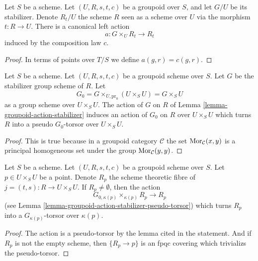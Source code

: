 \begin{lemma}
\label{lemma-groupoid-action-stabilizer}
Let $S$ be a scheme.
Let $(U, R, s, t, c)$ be a groupoid over $S$, and let $G/U$ be its stabilizer.
Denote $R_t/U$ the scheme $R$ seen as a scheme over $U$ via the
morphism $t : R \to U$.
There is a canonical left action
$$
a : G \times_U R_t \longrightarrow R_t
$$
induced by the composition law $c$.
\end{lemma}

\begin{proof}
In terms of points over $T/S$ we define $a(g, r) = c(g, r)$.
\end{proof}

\begin{lemma}
\label{lemma-groupoid-action-stabilizer-pseudo-torsor}
Let $S$ be a scheme. Let $(U, R, s, t, c)$ be a groupoid scheme
over $S$. Let $G$ be the stabilizer group scheme of $R$.
Let
$$
G_0 = G \times_{U, \text{pr}_0} (U \times_S U) = G \times_S U
$$
as a group scheme over $U \times_S U$. The action of $G$ on $R$ of
Lemma \ref{lemma-groupoid-action-stabilizer}
induces an action of $G_0$ on $R$ over $U \times_S U$
which turns $R$ into a pseudo $G_0$-torsor over $U \times_S U$.
\end{lemma}

\begin{proof}
This is true because in a groupoid category $\mathcal{C}$ the set
$\mathop{\rm Mor}\nolimits_\mathcal{C}(x, y)$ is a principal homogeneous set
under the group $\mathop{\rm Mor}\nolimits_\mathcal{C}(y, y)$.
\end{proof}

\begin{lemma}
\label{lemma-fibres-j}
Let $S$ be a scheme. Let $(U, R, s, t, c)$ be a groupoid scheme over $S$.
Let $p \in U \times_S U$ be a point. Denote
$R_p$ the scheme theoretic fibre of $j = (t, s) : R \to U \times_S U$.
If $R_p \not = \emptyset$, then the action
$$
G_{0, \kappa(p)} \times_{\kappa(p)} R_p \longrightarrow R_p
$$
(see
Lemma \ref{lemma-groupoid-action-stabilizer-pseudo-torsor})
which turns $R_p$ into a $G_{\kappa(p)}$-torsor over $\kappa(p)$.
\end{lemma}

\begin{proof}
The action is a pseudo-torsor by the lemma cited in the statement.
And if $R_p$ is not the empty scheme, then $\{R_p \to p\}$
is an fpqc covering which trivializs the pseudo-torsor.
\end{proof}







